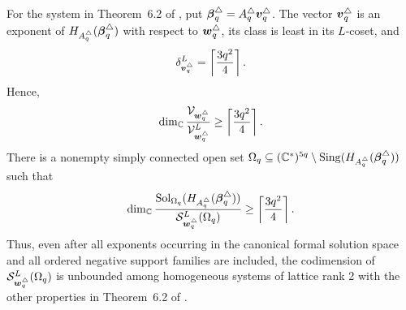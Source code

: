 \begin{theorem}
	\label{thm:fixed-rank-unbounded-solution-codimension}
	For the system in Theorem~6.2 of \cite{Nak26}, put \(\boldsymbol{\beta}_q^\triangle=A_q^\triangle\boldsymbol{v}_q^\triangle\).
	The vector \(\boldsymbol{v}_q^\triangle\) is an exponent of \(H_{A_q^\triangle}(\boldsymbol{\beta}_q^\triangle)\) with respect to \(\boldsymbol{w}_q^\triangle\), its class is least in its \(L\)-coset, and
	\begin{equation}
		\delta_{\boldsymbol{v}_q^\triangle}^{L}
		=
		\left\lceil\frac{3q^2}{4}\right\rceil.
		\label{eq:fixed-rank-local-all-family-codimension}
	\end{equation}
	Hence,
	\begin{equation}
		\dim_{\mathbb C}
		\frac{\mathcal V_{\boldsymbol{w}_q^\triangle}}
		{\mathcal V_{\boldsymbol{w}_q^\triangle}^{L}}
		\geq
		\left\lceil\frac{3q^2}{4}\right\rceil.
		\label{eq:fixed-rank-formal-solution-codimension}
	\end{equation}
	There is a nonempty simply connected open set \(\Omega_q \subseteq (\mathbb C^*)^{5q}\setminus \operatorname{Sing}(H_{A_q^\triangle}(\boldsymbol{\beta}_q^\triangle))\) such that
	\begin{equation}
		\dim_{\mathbb C}
		\frac{
		\operatorname{Sol}_{\Omega_q}(H_{A_q^\triangle}(\boldsymbol{\beta}_q^\triangle))
		}{
			\mathcal S_{\boldsymbol{w}_q^\triangle}^{L}(\Omega_q)
		}
		\geq
		\left\lceil\frac{3q^2}{4}\right\rceil.
		\label{eq:fixed-rank-holomorphic-solution-codimension}
	\end{equation}
	Thus, even after all exponents occurring in the canonical formal solution space and all ordered negative support families are included, the codimension of \(\mathcal S_{\boldsymbol{w}_q^\triangle}^{L}(\Omega_q)\) is unbounded among homogeneous systems of lattice rank 2 with the other properties in Theorem~6.2 of \cite{Nak26}.
\end{theorem}

